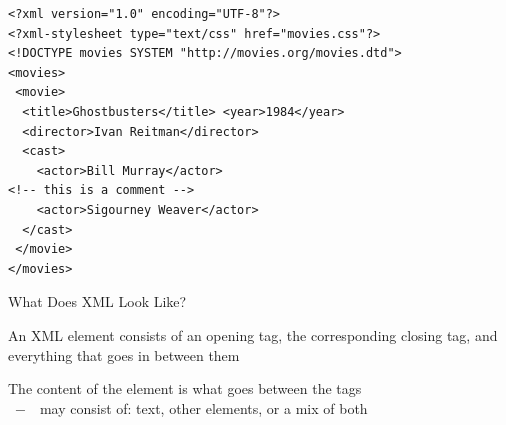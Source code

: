 \newsavebox\exampleXMLDTD
\begin{lrbox}{\exampleXMLDTD}
\begin{lstlisting}[style=markup]
<?xml version="1.0" encoding="UTF-8"?>
<?xml-stylesheet type="text/css" href="movies.css"?>
<!DOCTYPE movies SYSTEM "http://movies.org/movies.dtd">
<movies>
 <movie> 
  <title>Ghostbusters</title> <year>1984</year>
  <director>Ivan Reitman</director>
  <cast>
    <actor>Bill Murray</actor>
<!-- this is a comment -->
    <actor>Sigourney Weaver</actor>
  </cast>
 </movie>
</movies>
\end{lstlisting}
\end{lrbox}


\begin{frame}[fragile]{What Does XML Look Like?}

\vspace*{-2em}
\begin{center}
\end{center}

An XML element consists of an opening tag, the corresponding closing tag, and everything that goes in between them

The \alert{content of the element} is what goes between the tags\\
~$-$~~may consist of: text, other elements, or a mix of both

\end{frame}


